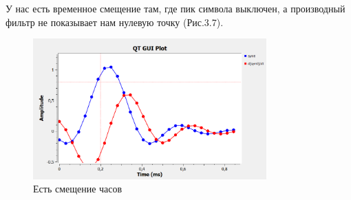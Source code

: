 \documentclass[a4paper,12pt]{report}
\begin{document}
    У нас есть временное смещение там, где пик символа выключен, а производный фильтр не показывает нам нулевую точку (Рис.3.7).
\begin{figure}[H]
        \centering
        \includegraphics[width=0.8\textwidth]{fig3-7.PNG}
        \caption{Есть смещение часов}
        \label{fig:fig3-7}
\end{figure}
\end{document}
